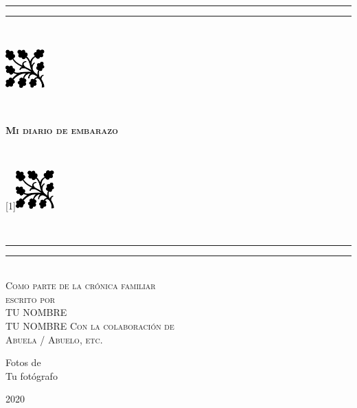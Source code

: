 {\begingroup
\centering
\vfill
\parbox{\textwidth}{%
\rule{\textwidth}{1.6pt}\vspace*{-\baselineskip}\vspace*{2pt} %
\rule{\textwidth}{0.4pt}\\[0.2\baselineskip] %
\parbox{\textwidth}{%
\parbox[c][1.5cm][c]{1.5cm}{\includegraphics[height=1.5cm]{tikz/19}}
~ \hrulefill ~
\parbox[c][2cm][c]{7cm}{\centering\textsc{\Large \textbf{Mi diario de embarazo}}}
 ~\hrulefill ~
\parbox[c][1.5cm][c]{1.5cm}{\scalebox{-1}[1]{\includegraphics[height=1.5cm]{tikz/19}}}}\\[0.2\baselineskip] %
\rule{\textwidth}{0.4pt}\vspace*{-\baselineskip}\vspace{3.2pt} %
\rule{\textwidth}{1.6pt}}\\[\baselineskip] %
\scshape %
Como parte de la crónica familiar \\[0.2\baselineskip] %

\vspace*{2\baselineskip} %
escrito por \\[0.5\baselineskip]
{\Large TU NOMBRE}  \\
\Large
TU NOMBRE %
\vfill
{Con la colaboración de  \\ {Abuela / Abuelo, etc.}} %
\vfill \vfill
{Fotos de  \\ {Tu fotógrafo}\par} %

\vfill %

{\scshape 2020} \\[0.3\baselineskip] %

\endgroup}
